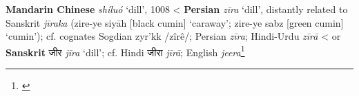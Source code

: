 \begin{etymology}\label{ety:shiluo}
\textbf{Mandarin Chinese}  \textit{shíluó} `dill', 1008
< \textbf{Persian} \textit{zīra} `dill', distantly related to Sanskrit \textit{jīraka} (zire-ye siyāh [black cumin] `caraway'; zire-ye sabz [green cumin] `cumin'); cf. cognates Sogdian zyr'kk /zîrê/; Persian \textit{zīra}; Hindi-Urdu \textit{zīrā}
< or \textbf{Sanskrit} {जीर} \textit{jīra} `dill'; cf. Hindi जीरा \textit{jīrā}; English \textit{jeera}\footnote{\textcite[634]{steingass_comprehensive_1892}}
\end{etymology}